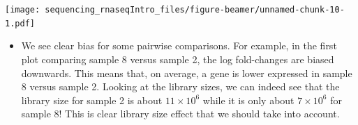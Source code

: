 \documentclass[ignorenonframetext,]{beamer}
\newenvironment{Shaded}{\begin{snugshade}}{\end{snugshade}}
\newcommand{\ControlFlowTok}[1]{\textcolor[rgb]{0.13,0.29,0.53}{\textbf{#1}}}
\newcommand{\DataTypeTok}[1]{\textcolor[rgb]{0.13,0.29,0.53}{#1}}
\newcommand{\DecValTok}[1]{\textcolor[rgb]{0.00,0.00,0.81}{#1}}
\newcommand{\KeywordTok}[1]{\textcolor[rgb]{0.13,0.29,0.53}{\textbf{#1}}}
\newcommand{\NormalTok}[1]{#1}
\newcommand{\OperatorTok}[1]{\textcolor[rgb]{0.81,0.36,0.00}{\textbf{#1}}}
\newcommand{\StringTok}[1]{\textcolor[rgb]{0.31,0.60,0.02}{#1}}
\providecommand{\tightlist}{%
  \setlength{\itemsep}{0pt}\setlength{\parskip}{0pt}}
\begin{document}
\begin{frame}[fragile]
\begin{Shaded}
\end{Shaded}

\texttt{[image: sequencing\_rnaseqIntro\_files/figure-beamer/unnamed-chunk-10-1.pdf]}

\begin{itemize}
\tightlist
\item
  We see clear bias for some pairwise comparisons. For example, in the
  first plot comparing sample 8 versus sample 2, the log fold-changes
  are biased downwards. This means that, on average, a gene is lower
  expressed in sample 8 versus sample 2. Looking at the library sizes,
  we can indeed see that the library size for sample 2 is about
  \(11 \times 10^6\) while it is only about \(7 \times 10^6\) for sample
  8! This is clear library size effect that we should take into account.
\end{itemize}


\end{frame}
\end{document}
